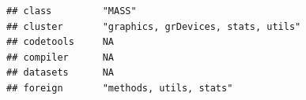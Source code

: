 \documentclass[]{article}
\begin{document}
\begin{verbatim}
## class         "MASS"                                                                                                                                                                                                                                                                                                                                                                                                                                                                                
## cluster       "graphics, grDevices, stats, utils"                                                                                                                                                                                                                                                                                                                                                                                                                                                   
## codetools     NA                                                                                                                                                                                                                                                                                                                                                                                                                                                                                    
## compiler      NA                                                                                                                                                                                                                                                                                                                                                                                                                                                                                    
## datasets      NA                                                                                                                                                                                                                                                                                                                                                                                                                                                                                    
## foreign       "methods, utils, stats"                                                                                                                                                                                                                                                                                                                                                                                                                                                               

\end{verbatim}
\end{document}
